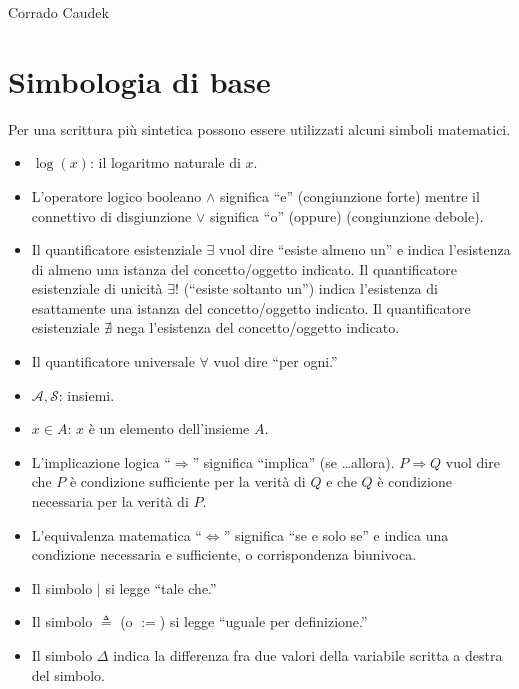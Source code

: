 \documentclass[
  10pt,
  italian,
  a4paper,
  extrafontsizes,onecolumn,openright
  ]{memoir}
\providecommand{\tightlist}{%
  \setlength{\itemsep}{0pt}\setlength{\parskip}{0pt}}
\begin{document}
\bigskip

Corrado Caudek

\mainmatter

\hypertarget{appendix-appendix}{%
\appendix}


\hypertarget{simbologia-di-base}{%
\chapter{Simbologia di base}\label{simbologia-di-base}}

Per una scrittura più sintetica possono essere utilizzati alcuni simboli
matematici.

\begin{itemize}
\tightlist
\item
  \(\log(x)\): il logaritmo naturale di \(x\).
\item
  L'operatore logico booleano \(\land\) significa ``e'' (congiunzione
  forte) mentre il connettivo di disgiunzione \(\lor\) significa ``o''
  (oppure) (congiunzione debole).
\item
  Il quantificatore esistenziale \(\exists\) vuol dire ``esiste almeno
  un'' e indica l'esistenza di almeno una istanza del concetto/oggetto
  indicato. Il quantificatore esistenziale di unicità \(\exists!\)
  (``esiste soltanto un'') indica l'esistenza di esattamente una istanza
  del concetto/oggetto indicato. Il quantificatore esistenziale
  \(\nexists\) nega l'esistenza del concetto/oggetto indicato.
\item
  Il quantificatore universale \(\forall\) vuol dire ``per ogni.''
\item
  \(\mathcal{A, S}\): insiemi.
\item
  \(x \in A\): \(x\) è un elemento dell'insieme \(A\).
\item
  L'implicazione logica ``\(\Rightarrow\)'' significa ``implica'' (se
  \ldots allora). \(P \Rightarrow Q\) vuol dire che \(P\) è condizione
  sufficiente per la verità di \(Q\) e che \(Q\) è condizione necessaria
  per la verità di \(P\).
\item
  L'equivalenza matematica ``\(\iff\)'' significa ``se e solo se'' e indica
  una condizione necessaria e sufficiente, o corrispondenza biunivoca.
\item
  Il simbolo \(\vert\) si legge ``tale che.''
\item
  Il simbolo \(\triangleq\) (o \(:=\)) si legge ``uguale per definizione.''
\item
  Il simbolo \(\Delta\) indica la differenza fra due valori della
  variabile scritta a destra del simbolo.

\end{itemize}
\end{document}
